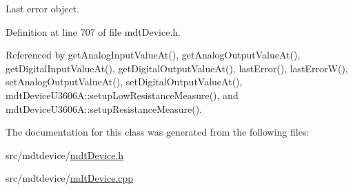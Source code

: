 Last error object. 



Definition at line 707 of file mdt\-Device.\-h.



Referenced by get\-Analog\-Input\-Value\-At(), get\-Analog\-Output\-Value\-At(), get\-Digital\-Input\-Value\-At(), get\-Digital\-Output\-Value\-At(), last\-Error(), last\-Error\-W(), set\-Analog\-Output\-Value\-At(), set\-Digital\-Output\-Value\-At(), mdt\-Device\-U3606\-A\-::setup\-Low\-Resistance\-Measure(), and mdt\-Device\-U3606\-A\-::setup\-Resistance\-Measure().



The documentation for this class was generated from the following files\-:\begin{DoxyCompactItemize}
\item 
src/mdtdevice/\hyperlink{mdt_device_8h}{mdt\-Device.\-h}\item 
src/mdtdevice/\hyperlink{mdt_device_8cpp}{mdt\-Device.\-cpp}\end{DoxyCompactItemize}
